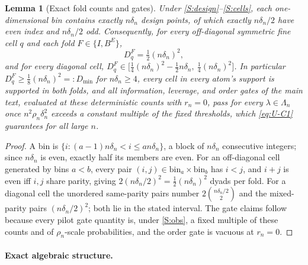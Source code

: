 \documentclass[11pt]{article}
\newtheorem{lemma}[theorem]{Lemma}
\theoremstyle{definition}
\newcommand{\1}{\mathbf 1}\newcommand{\op}{\operatorname}
\begin{document}
\begin{lemma}[Exact fold counts and gates]\label{lem:U-counts}
Under \ref{S:design}--\ref{S:cells}, each one-dimensional bin contains exactly
$n\delta_n$ design points, of which exactly $n\delta_n/2$ have even index and
$n\delta_n/2$ odd.  Consequently, for every off-diagonal symmetric fine cell
$q$ and each fold $F\in\{I,B^E\}$,
\[
D_q^F=\tfrac12(n\delta_n)^2,
\]
and for every diagonal cell,
$D_q^F\in\bigl[\tfrac14(n\delta_n)^2-\tfrac12 n\delta_n,\
\tfrac14(n\delta_n)^2\bigr]$.
In particular $D_q^F\ge\tfrac18(n\delta_n)^2=:D_{\min}$ for $n\delta_n\ge4$,
every cell in every atom's support is supported in both folds, and all
information, leverage, and order gates of the main text, evaluated at these
deterministic counts with $r_n=0$, pass for every $\lambda\in\Lambda_n$ once
$n^2\rho_n\delta_n^2$ exceeds a constant multiple of the fixed thresholds,
which \eqref{eq:U-C1} guarantees for all large $n$.
\end{lemma}

\begin{proof}
A bin is $\{i:(a-1)n\delta_n<i\le an\delta_n\}$, a block of $n\delta_n$
consecutive integers; since $n\delta_n$ is even, exactly half its members are
even.  For an off-diagonal cell generated by bins $a<b$, every pair
$(i,j)\in\text{bin}_a\times\text{bin}_b$ has $i<j$, and $i+j$ is even iff $i,j$
share parity, giving $2(n\delta_n/2)^2=\tfrac12(n\delta_n)^2$ dyads per fold.
For a diagonal cell the unordered same-parity pairs number
$2\binom{n\delta_n/2}{2}$ and the mixed-parity pairs $(n\delta_n/2)^2$; both lie
in the stated interval.  The gate claims follow because every pilot gate quantity is, under \ref{S:obs}, a fixed multiple of these counts and of
$\rho_n$-scale probabilities, and the order gate is vacuous at $r_n=0$.
\end{proof}

\paragraph{Exact algebraic structure.}
\end{document}
